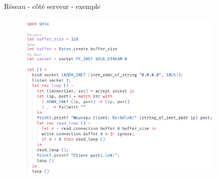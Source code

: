\begin{frame}[fragile]{Réseau - côté serveur - exemple}

\begin{figure}
    \centering
    \includegraphics[width=0.9\textwidth]{slides/images/unixsocketserver.png}
\end{figure}

\end{frame}
